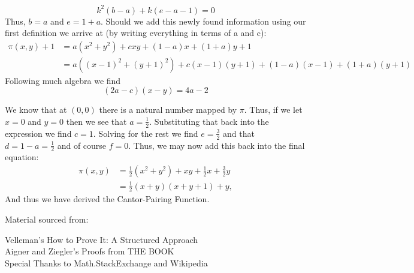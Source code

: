 \documentclass{article}
\begin{document}
\[
k^2(b-a)+k(e-a-1)=0
\] 
Thus, $b=a$ and $e=1+a$. Should we add this newly found information using our first definition we arrive at (by writing everything in terms of a and c):
\[
{\begin{aligned}\pi (x,y)+1&=a(x^{2}+y^{2})+cxy+(1-a)x+(1+a)y+1\\&=a((x-1)^{2}+(y+1)^{2})+c(x-1)(y+1)+(1-a)(x-1)+(1+a)(y+1)\end{aligned}}
\]
Following much algebra we find
\[
(2a-c)(x-y)=4a-2
\]
\par We know that at $(0,0)$ there is a natural number mapped by $\pi$. Thus, if we let $x=0$ and $y=0$ then we see that $a=\frac{1}{2}$. Substituting that back into the expression we find $c=1$. Solving for the rest we find $e=\frac{3}{2}$ and that $d=1-a=\frac{1}{2}$ and of course $f=0$. Thus, we may now add this back into the final equation:
\[
{\begin{aligned}\pi (x,y)&={\frac {1}{2}}(x^{2}+y^{2})+xy+{\frac {1}{2}}x+{\frac {3}{2}}y\\&={\frac {1}{2}}(x+y)(x+y+1)+y,\end{aligned}}
\]
And thus we have derived the Cantor-Pairing Function.
\\
\begin{center}
Material sourced from:
\end{center}
Velleman's How to Prove It: A Structured Approach
\\
Aigner and Ziegler's Proofs from THE BOOK
\\
Special Thanks to Math.StackExchange and Wikipedia
\end{document}

